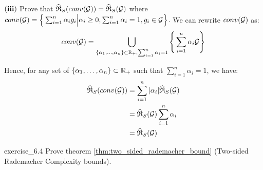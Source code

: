 \begin{solution*}
    \begin{subproof}{\newline ${\bf (iii)}$ Prove that $\widehat{\mathfrak{R}}_S(conv(\mathcal{G}))=\widehat{\mathfrak{R}}_S(\mathcal{G})$ \newline where $conv(\mathcal{G})=\Big\{ \sum_{i=1}^n \alpha_ig_i\Big|\alpha_i\ge0, \sum_{i=1}^n\alpha_i=1, g_i\in\mathcal{G} \Big\}$.}
        We can rewrite $conv(\mathcal{G})$ as:
        \begin{align*}
            conv(\mathcal{G}) = \bigcup_{\{\alpha_1, \dots, \alpha_n\}\subset\mathbb{R}_+, \sum_{i=1}^n\alpha_i=1} \Bigg\{ \sum_{i=1}^n \alpha_i \mathcal{G} \Bigg\}
        \end{align*}

        \noindent Hence, for any set of $\{\alpha_1, \dots, \alpha_n\}\subset \mathbb{R}_+$ such that $\sum_{i=1}^n \alpha_i =1$, we have:
        \begin{align*}
            \widehat{\mathfrak{R}}_S(conv(\mathcal{G})) &= \sum_{i=1}^n |\alpha_i| \widehat{\mathfrak{R}}_S(\mathcal{G}) \\
                &= \widehat{\mathfrak{R}}_S(\mathcal{G}) \sum_{i=1}^n \alpha_i \\
                &= \widehat{\mathfrak{R}}_S(\mathcal{G})
        \end{align*}
    \end{subproof}
\end{solution*}

\begin{exercise}{}{exercise_6.4}
    Prove theorem \ref{thm:two_sided_rademacher_bound} (Two-sided Rademacher Complexity bounds).
\end{exercise}

